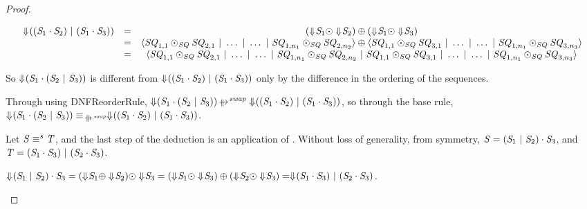 \documentclass[acmsmall]{acmart}
\begin{document}
\begin{proof}
\begin{case}[\DistributivityLeftRule{}]
    \[
      \begin{array}{ccc}
        \Downarrow\mkern-4mu ((\mathit{S}_1 \cdot \mathit{S}_2) ~|~ (\mathit{S}_1 \cdot \mathit{S}_3))
        & = & (\Downarrow\mkern-4mu \mathit{S}_1 \odot \Downarrow\mkern-4mu \mathit{S}_2)
              \oplus
              (\Downarrow\mkern-4mu \mathit{S}_1 \odot \Downarrow\mkern-4mu \mathit{S}_3)\\
        & = & \langle\mathit{SQ}_{1,1}\odot_{\mathit{SQ}}\mathit{SQ}_{2,1} ~|~ 
              \ldots ~|~ \ldots ~|~ 
              \mathit{SQ}_{1,n_1}\odot_{\mathit{SQ}}\mathit{SQ}_{2,n_2}\rangle \oplus
              \langle\mathit{SQ}_{1,1}\odot_{\mathit{SQ}}\mathit{SQ}_{3,1} ~|~ 
              \ldots ~|~ \ldots ~|~ 
              \mathit{SQ}_{1,n_1}\odot_{\mathit{SQ}}\mathit{SQ}_{3,n_3}\rangle\\
        & = & \langle\mathit{SQ}_{1,1}\odot_{\mathit{SQ}}\mathit{SQ}_{2,1} ~|~ 
              \ldots ~|~ \ldots ~|~ 
              \mathit{SQ}_{1,n_1}\odot_{\mathit{SQ}}\mathit{SQ}_{2,n_2} ~|~ 
              \mathit{SQ}_{1,1}\odot_{\mathit{SQ}}\mathit{SQ}_{3,1} ~|~ 
              \ldots ~|~ \ldots ~|~ 
              \mathit{SQ}_{1,n_1}\odot_{\mathit{SQ}}\mathit{SQ}_{3,n_3}\rangle
      \end{array}
    \]

    So $\Downarrow\mkern-4mu (\mathit{S}_1 \cdot (\mathit{S}_2 ~|~ \mathit{S}_3))$
    is different from $\Downarrow\mkern-4mu ((\mathit{S}_1 \cdot \mathit{S}_2) ~|~ (\mathit{S}_1
      \cdot \mathit{S}_3))$ only by the difference in the ordering of the
    sequences.

    Through using DNFReorderRule{},
    $\ToDNFRegexOf{(\Regex_1 \Concat (\Regex_2 \Or
      \Regex_3))} \ParallelRewriteSwap
    \ToDNFRegexOf{((\Regex_1 \Concat \Regex_2) \Or (\Regex_1
      \Concat \Regex_3))}$, so through the base rule,
    $\ToDNFRegexOf{(\Regex_1 \Concat (\Regex_2 \Or
      \Regex_3))} \EquivalenceOf{\ParallelRewriteSwap}
    \ToDNFRegexOf{((\Regex_1 \Concat \Regex_2) \Or (\Regex_1
      \Concat \Regex_3))}$.
  \end{case}

  \begin{case}[\DistributivityRightRule{}]
    Let $\mathit{S} \equiv^s \mathit{T}$, and the last step of the
    deduction is an application of \DistributivityRightRule{}.  Without loss of
    generality, from symmetry,
    $\mathit{S} = (\mathit{S}_1 ~|~ \mathit{S}_2) \cdot \mathit{S}_3$, and
    $\mathit{T} = (\mathit{S}_1 \cdot \mathit{S}_3) ~|~ (\mathit{S}_2 \cdot \mathit{S}_3)$.

    $\ToDNFRegexOf{(\Regex_1 \Or \Regex_2) \Concat \Regex_3} =
    (\ToDNFRegexOf{\Regex_1} \OrDNF \ToDNFRegexOf{\Regex_2}) \ConcatDNF
    \ToDNFRegexOf{\Regex_3} =
    (\ToDNFRegexOf{\Regex_1} \ConcatDNF \ToDNFRegexOf{\Regex_3}) \OrDNF
    (\ToDNFRegexOf{\Regex_2} \ConcatDNF \ToDNFRegexOf{\Regex_3}) =
    \ToDNFRegexOf{(\Regex_1 \Concat \Regex_3) \Or (\Regex_2 \Concat \Regex_3)}$.
    

\end{case}
\end{proof}
\end{document}
